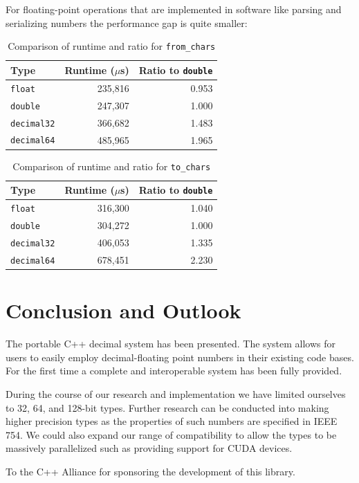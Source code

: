 \documentclass[acmsmall]{acmart}
\newcommand{\code}[1]{\texttt{#1}}
\begin{document}
For floating-point operations that are implemented in software like parsing and serializing numbers the performance gap is quite smaller:

\begin{table}[t]
\centering
\begin{tabular}{|l|r|r|}
\hline
Type & Runtime ($\mu$s) & Ratio to \texttt{double} \\
\hline
\texttt{float} & 235,816 & 0.953 \\
\texttt{double} & 247,307 & 1.000 \\
\texttt{decimal32} & 366,682 & 1.483 \\
\texttt{decimal64} & 485,965 & 1.965 \\
\hline
\end{tabular}
\caption{Comparison of runtime and ratio for \code{from\_chars}}
\label{tab:from-chars-comparison}
\end{table}

\begin{table}[t]
\centering
\begin{tabular}{|l|r|r|}
\hline
Type & Runtime ($\mu$s) & Ratio to \texttt{double} \\
\hline
\texttt{float} & 316,300 & 1.040 \\
\texttt{double} & 304,272 & 1.000 \\
\texttt{decimal32} & 406,053 & 1.335 \\
\texttt{decimal64} & 678,451 & 2.230 \\
\hline
\end{tabular}
\caption{Comparison of runtime and ratio for \code{to\_chars}}
\label{tab:to-chars-runtime-comparison}
\end{table}

\section{Conclusion and Outlook}

The portable C++ decimal system has been presented.
The system allows for users to easily employ decimal-floating point numbers in their existing code bases.
For the first time a complete and interoperable system has been fully provided.

During the course of our research and implementation we have limited ourselves to 32, 64, and 128-bit types.
Further research can be conducted into making higher precision types as the properties of such numbers are specified in IEEE 754.
We could also expand our range of compatibility to allow the types to be massively parallelized such as providing support for CUDA devices.

\begin{acks}
To the C++ Alliance for sponsoring the development of this library. 
\end{acks}


\nocite{*}

\end{document}

